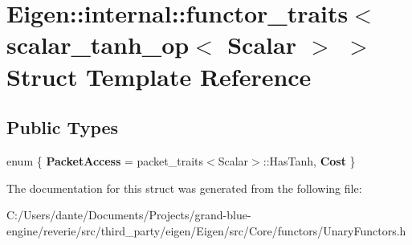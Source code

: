 \hypertarget{struct_eigen_1_1internal_1_1functor__traits_3_01scalar__tanh__op_3_01_scalar_01_4_01_4}{}\section{Eigen\+::internal\+::functor\+\_\+traits$<$ scalar\+\_\+tanh\+\_\+op$<$ Scalar $>$ $>$ Struct Template Reference}
\label{struct_eigen_1_1internal_1_1functor__traits_3_01scalar__tanh__op_3_01_scalar_01_4_01_4}
\subsection*{Public Types}
\begin{DoxyCompactItemize}
\item 
\mbox{\label{struct_eigen_1_1internal_1_1functor__traits_3_01scalar__tanh__op_3_01_scalar_01_4_01_4_aee55fd2bb7ba27ddae879d5979b1ae52}} 
enum \{ {\bfseries Packet\+Access} = packet\+\_\+traits$<$Scalar$>$\+::Has\+Tanh, 
{\bfseries Cost}
 \}
\end{DoxyCompactItemize}


The documentation for this struct was generated from the following file\+:\begin{DoxyCompactItemize}
\item 
C\+:/\+Users/dante/\+Documents/\+Projects/grand-\/blue-\/engine/reverie/src/third\+\_\+party/eigen/\+Eigen/src/\+Core/functors/Unary\+Functors.\+h\end{DoxyCompactItemize}
